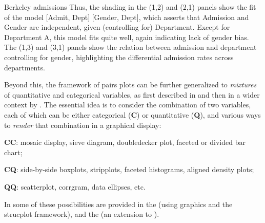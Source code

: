 \documentclass[11pt]{book}
\renewenvironment{knitrout}{\small\renewcommand{\baselinestretch}{.85}}{} %
\begin{document}
\begin{Example}[berkeley4b]{Berkeley admissions}
\begin{knitrout}
\end{knitrout}
Thus, the shading in the (1,2) and (2,1) panels show the fit of the model
[Admit, Dept] [Gender, Dept],
which asserts that Admission and Gender are independent, given (controlling
for) Department.  Except for Department A, this model fits quite well,
again indicating lack of gender bias.
The (1,3) and (3,1) panels show the relation between admission and department
controlling for gender, highlighting the differential admission rates
across departments.

\end{Example}

Beyond this, the framework of pairs plots can be further generalized to \emph{mixtures}
of quantitative and categorical variables, as first described in \citet{Friendly:03:apa}
and then in a wider context by \citet{Emerson-etal:2013,Friendly:2013:genpairs}.
The essential idea is to consider the combination of two variables, each of which can
be either categorical (\textbf{C}) or quantitative (\textbf{Q}), and various ways to \emph{render} that
combination in a graphical display:

\begin{description*}
  \item[\textbf{CC}:] mosaic display, sieve diagram, doubledecker plot, faceted or divided bar chart;
  \item[\textbf{CQ}:] side-by-side boxplots, stripplots, faceted histograms, aligned density plots;
  \item[\textbf{QQ}:] scatterplot, corrgram, data ellipses, etc.
\end{description*}
In \R some of these possibilities are provided in the  (using  graphics
and the  strucplot framework), and the 
(an extension to ).
\end{document}
